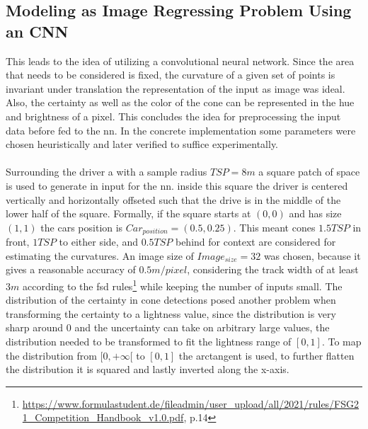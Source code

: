 \subsection{Modeling as Image Regressing Problem Using an CNN}
This leads to the idea of utilizing a convolutional neural network. Since the area that needs to be considered is fixed, the curvature of a given set of points is invariant under translation the representation of the input as image was ideal. Also, the certainty as well as the color of the cone can be represented in the hue and brightness of a pixel. This concludes the idea for preprocessing the input data before fed to the \ac{nn}. In the concrete implementation some parameters were chosen heuristically and later verified to suffice experimentally.\\
\\
Surrounding the driver a with a sample radius $TSP = 8m$ a square patch of space is used to generate in input for the \ac{nn}. inside this square the driver is centered vertically and horizontally offseted such that the drive is in the middle of the lower half of the square. Formally, if the square starts at $(0,0)$ and has size $(1,1)$ the cars position is $Car_{position}=(0.5,0.25)$. This meant cones $1.5TSP$ in front, $1TSP$ to either side, and $0.5TSP$ behind for context are considered for estimating the curvatures. An image size of $Image_{size}=32$ was chosen, because it gives a reasonable accuracy of $0.5m/pixel$, considering the track width of at least $3m$ according to the \ac{fsd} rules\footnote{\url{https://www.formulastudent.de/fileadmin/user_upload/all/2021/rules/FSG21_Competition_Handbook_v1.0.pdf}, p.14} while keeping the number of inputs small. The distribution of the certainty in cone detections posed another problem when transforming the certainty to a lightness value, since the distribution is very sharp around 0 and the uncertainty can take on arbitrary large values, the distribution needed to be transformed to fit the lightness range of $[0,1]$. To map the distribution from $[0,+\infty[$ to $[0,1]$ the arctangent is used, to further flatten the distribution it is squared and lastly inverted along the x-axis. 
